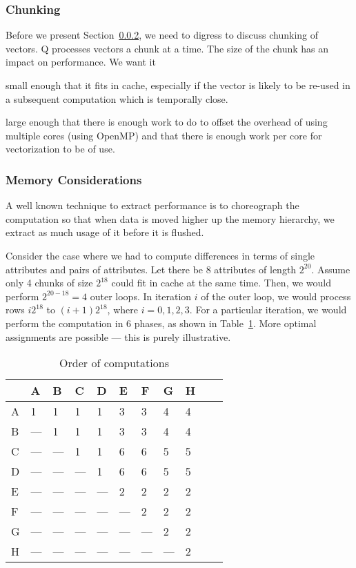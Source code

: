 \subsubsection{Chunking}
\label{Chunking}

Before we present Section~\ref{MemoryConsiderations}, we need to digress to
discuss chunking of vectors. Q processes vectors a chunk at a time. The size of
the chunk has an impact on performance. We want it 
\bi
\item small enough that it fits in cache, especially if the vector is likely to
be re-used in a subsequent computation which is temporally close.
\item large enough that there is enough work to do to offset the overhead of
using multiple cores (using OpenMP) and that there is enough work per core for
vectorization to be of use.
\ei

\subsubsection{Memory Considerations}
\label{MemoryConsiderations}

A well known technique to extract performance is to choreograph the computation
so that when data is moved higher up the memory hierarchy, we extract as much
usage of it before it is flushed.

Consider the case where we had to compute differences in terms of single
attributes and pairs of attributes. 
Let there be  8 attributes of length \(2^{20}\).
Assume only 4 chunks of size \(2^{18}\)
could fit in cache at the same time. 
Then, we would perform \(2^{20-18} = 4\) outer loops. 
In iteration \(i\) of the outer loop, we would process rows \(i 2^{18}\) to
\((i+1)2^{18}\), where \(i = 0, 1, 2, 3\). For a particular iteration,
we would perform the computation in 6 phases, as shown in
Table~\ref{tbl_choreography}. More optimal assignments are possible --- this is
purely illustrative.


\begin{table}[hbtp]
\centering
\begin{tabular}{|l|l|l|l|l|l|l|l|l|l|l|} \hline \hline
  & A   & B   & C   & D   & E   & F   & G   & H \\ \hline
A &  1  &  1  &  1  &  1  &  3  &  3  &  4  &  4  \\ \hline
B & --- &  1  &  1  &  1  &  3  &  3  &  4  &  4  \\ \hline
C & --- & --- &  1  &  1  &  6  &  6  &  5  &  5  \\ \hline
D & --- & --- & --- &  1  &  6  &  6  &  5  &  5  \\ \hline
E & --- & --- & --- & --- &  2  &  2  &  2  &  2  \\ \hline
F & --- & --- & --- & --- & --- &  2  &  2  &  2  \\ \hline
G & --- & --- & --- & --- & --- & --- &  2  &  2  \\ \hline
H & --- & --- & --- & --- & --- & --- & --- &  2  \\ \hline

\end{tabular}
\caption{Order of computations}
\label{tbl_choreography}
\end{table}

